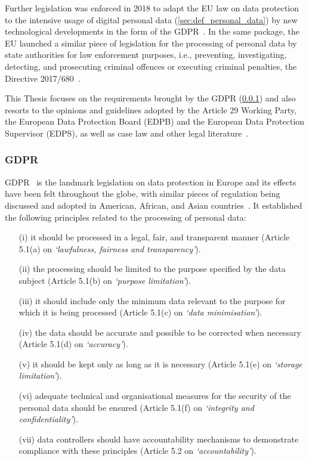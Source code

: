 Further legislation was enforced in 2018 to adapt the EU law on data protection to the intensive usage of digital personal data (\ref{sec:def_personal_data}) by new technological developments in the form of the GDPR~\citeyearpar{noauthor_regulation_2016}.
In the same package, the EU launched a similar piece of legislation for the processing of personal data by state authorities for law enforcement purposes, i.e., preventing, investigating, detecting, and prosecuting criminal offences or executing criminal penalties, the Directive 2017/680~\citeyearpar{noauthor_directive_2016}.

This Thesis focuses on the requirements brought by the GDPR (\ref{sec:def_gdpr}) and also resorts to the opinions and guidelines adopted by the Article 29 Working Party, the European Data Protection Board (EDPB) and the European Data Protection Supervisor (EDPS), as well as case law and other legal literature~\citep{european_union_agency_for_fundamental_rights_and_council_of_europe_handbook_2018}.

\subsubsection{GDPR}
\label{sec:def_gdpr}

GDPR~\citeyearpar{noauthor_regulation_2016} is the landmark legislation on data protection in Europe and its effects have been felt throughout the globe, with similar pieces of regulation being discussed and adopted in American, African, and Asian countries~\citep{bradford_brussels_2019}.
It established the following principles related to the processing of personal data:
\begin{enumerate}
    \item [(i)] it should be processed in a legal, fair, and transparent manner (Article 5.1(a) on \textit{`lawfulness, fairness and transparency'}).
    \item [(ii)] the processing should be limited to the purpose specified by the data subject (Article 5.1(b) on \textit{`purpose limitation'}).
    \item [(iii)] it should include only the minimum data relevant to the purpose for which it is being processed (Article 5.1(c) on \textit{`data minimisation'}).
    \item [(iv)] the data should be accurate and possible to be corrected when necessary (Article 5.1(d) on \textit{`accuracy'}).
    \item [(v)] it should be kept only as long as it is necessary (Article 5.1(e) on \textit{`storage limitation'}).
    \item [(vi)] adequate technical and organisational measures for the security of the personal data should be ensured (Article 5.1(f) on \textit{`integrity and confidentiality'}).
    \item [(vii)] data controllers should have accountability mechanisms to demonstrate compliance with these principles (Article 5.2 on \textit{`accountability'}).
\end{enumerate}

